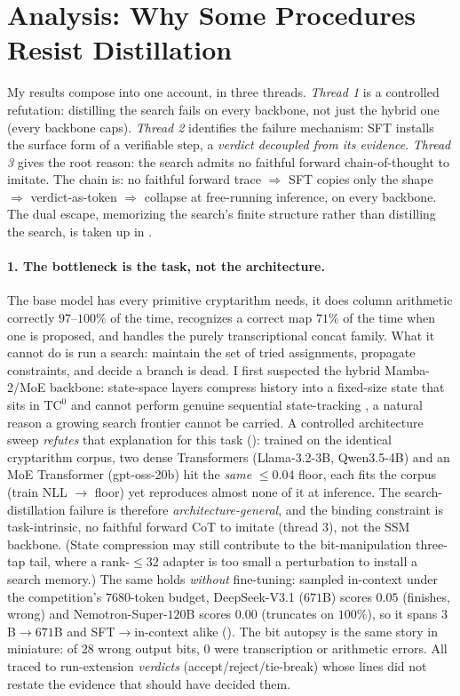 \documentclass[11pt]{article}
\begin{document}
\section{Analysis: Why Some Procedures Resist Distillation}
\label{sec:analysis}

My results compose into one account, in three threads. \emph{Thread 1} is a controlled
refutation: distilling the search fails on every backbone, not just the hybrid one (every
backbone caps). \emph{Thread 2} identifies the failure mechanism: SFT installs the surface form of
a verifiable step, a \emph{verdict decoupled from its evidence}. \emph{Thread 3} gives the root
reason: the search admits no faithful forward chain-of-thought to imitate. The chain is: no
faithful forward trace $\Rightarrow$ SFT copies only the shape $\Rightarrow$ verdict-as-token
$\Rightarrow$ collapse at free-running inference, on every backbone. The dual escape, memorizing
the search's finite structure rather than distilling the search, is taken up in .

\paragraph{1. The bottleneck is the task, not the architecture.}
The base model has every primitive cryptarithm needs, it does column arithmetic correctly
$97$--$100\%$ of the time, recognizes a correct map $71\%$ of the time when one is proposed,
and handles the purely transcriptional concat family. What it cannot do is run a search:
maintain the set of tried assignments, propagate constraints, and decide a branch is dead.
I first suspected the hybrid Mamba-2/MoE backbone: state-space layers compress history into a
fixed-size state \citep{dao2024mamba2} that sits in $\mathrm{TC}^0$ and cannot perform genuine
sequential state-tracking \citep{merrill2024illusion}, a natural reason a growing search
frontier cannot be carried. A controlled architecture sweep \emph{refutes} that explanation for
this task (): trained on the identical cryptarithm corpus, two dense
Transformers (Llama-3.2-3B, Qwen3.5-4B) and an MoE Transformer (gpt-oss-20b) hit the \emph{same}
$\leq\!0.04$ floor, each fits the corpus (train NLL $\to$ floor) yet reproduces almost none of
it at inference. The search-distillation failure is therefore \emph{architecture-general}, and
the binding constraint is task-intrinsic, no faithful forward CoT to imitate (thread 3), not the
SSM backbone. (State compression may still contribute to the bit-manipulation three-tap tail,
where a rank-$\leq\!32$ adapter is too small a perturbation to install a search memory.) The same
holds \emph{without} fine-tuning: sampled in-context under the competition's $7680$-token budget,
DeepSeek-V3.1 ($671$B) scores $0.05$ (finishes, wrong) and Nemotron-Super-$120$B scores $0.00$
(truncates on $100\%$), so it spans $3$B$\to$$671$B and SFT$\to$in-context alike
().
The bit autopsy is the same story in miniature: of $28$ wrong output bits, $0$ were transcription or
arithmetic errors. All traced to run-extension \emph{verdicts} (accept/reject/tie-break)
whose lines did not restate the evidence that should have decided them.
\end{document}
